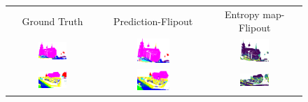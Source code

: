     \begin{figure}[h!]
        \centering
        \begin{tabular}{ccc}
            Ground Truth & Prediction-Flipout & Entropy map-Flipout \\
            \includegraphics[width=0.33\textwidth, height=0.18\textheight]{images/seg_output/sem3d_seg_output/1_GT.png} &
            \includegraphics[width=0.33\textwidth, height=0.18\textheight]{images/seg_output/flipout/sem3d_1.png}& 
            \includegraphics[width=0.33\textwidth, height=0.18\textheight]{images/seg_output/sem3d_seg_output/ent_fout_1.png}\\

            \includegraphics[width=0.33\textwidth, height=0.18\textheight]{images/seg_output/sem3d_seg_output/2_GT.png} &
            \includegraphics[width=0.33\textwidth, height=0.18\textheight]{images/seg_output/flipout/sem3d_2.png}& 
            \includegraphics[width=0.33\textwidth, height=0.18\textheight]{images/seg_output/sem3d_seg_output/ent_fout_2.png}\\


\end{tabular}
\end{figure}
